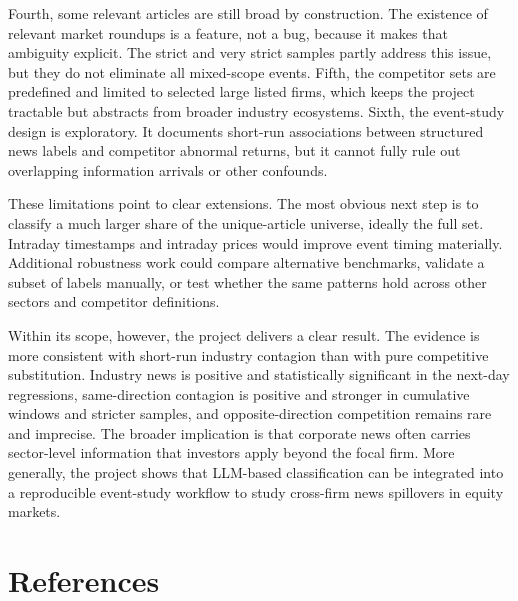 \documentclass[11pt]{article}
\begin{document}
Fourth, some relevant articles are still broad by construction. The existence of relevant market roundups is a feature, not a bug, because it makes that ambiguity explicit. The strict and very strict samples partly address this issue, but they do not eliminate all mixed-scope events. Fifth, the competitor sets are predefined and limited to selected large listed firms, which keeps the project tractable but abstracts from broader industry ecosystems. Sixth, the event-study design is exploratory. It documents short-run associations between structured news labels and competitor abnormal returns, but it cannot fully rule out overlapping information arrivals or other confounds.

These limitations point to clear extensions. The most obvious next step is to classify a much larger share of the unique-article universe, ideally the full set. Intraday timestamps and intraday prices would improve event timing materially. Additional robustness work could compare alternative benchmarks, validate a subset of labels manually, or test whether the same patterns hold across other sectors and competitor definitions.

Within its scope, however, the project delivers a clear result. The evidence is more consistent with short-run industry contagion than with pure competitive substitution. Industry news is positive and statistically significant in the next-day regressions, same-direction contagion is positive and stronger in cumulative windows and stricter samples, and opposite-direction competition remains rare and imprecise. The broader implication is that corporate news often carries sector-level information that investors apply beyond the focal firm. More generally, the project shows that LLM-based classification can be integrated into a reproducible event-study workflow to study cross-firm news spillovers in equity markets.

\section*{References}
\end{document}
